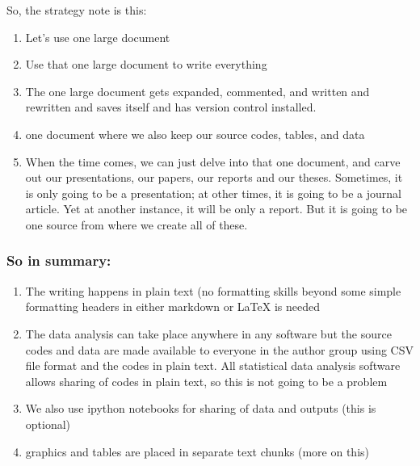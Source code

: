 So, the strategy note is this:

\begin{enumerate}
\item Let's use one large document
\item Use that one large document to write everything
\item The one large document gets expanded, commented, and written and rewritten and saves itself and has version control installed.
\item one document where we also keep our source codes, tables, and data
\item When the time comes, we can just delve into that one document, and carve out our presentations, our papers, our reports and our theses. Sometimes, it is only going to be a presentation; at other times, it is going to be a journal article. Yet at another instance, it will be only a report. But it is going to be one source from where we create all of these. 
\end{enumerate}

\subsubsection{So in summary:}

\begin{enumerate}
\item The writing happens in plain text (no formatting skills beyond some simple formatting headers in either markdown or LaTeX is needed
\item The data analysis can take place anywhere in any software but the source codes and data are made available to everyone in the author group using CSV file format and the codes in plain text. All statistical data analysis software allows sharing of codes in plain text, so this is not going to be a problem
\item We also use ipython notebooks for sharing of data and outputs (this is optional)
\item graphics and tables are placed in separate text chunks (more on this)
\end{enumerate}


    
    
    
    